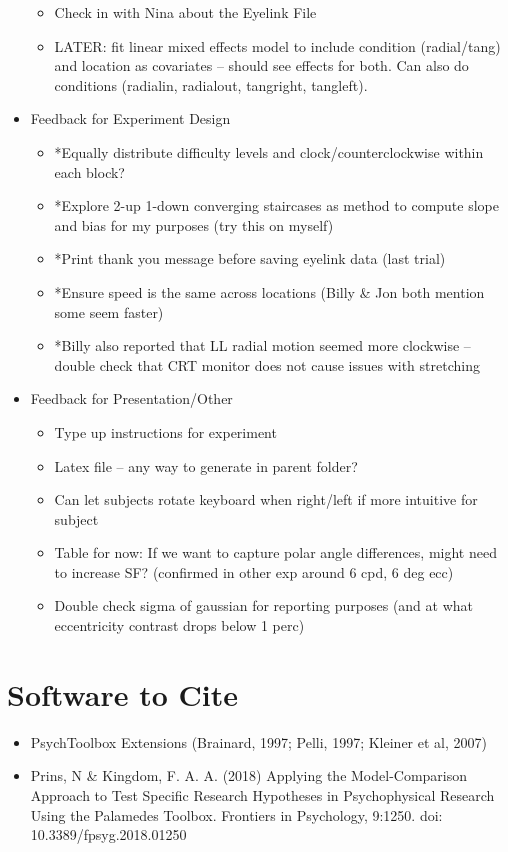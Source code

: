 \documentclass[11pt]{article} %
\begin{document}
\begin{itemize}
\begin{itemize}
	\item Check in with Nina about the Eyelink File
	\item LATER: fit linear mixed effects model to include condition (radial/tang) and location as covariates -- should see effects for both. Can also do conditions (radialin, radialout, tangright, tangleft).
	\end{itemize}
\item Feedback for Experiment Design
	\begin{itemize}
	\item *Equally distribute difficulty levels and clock/counterclockwise within each block?
	\item *Explore 2-up 1-down converging staircases as method to compute slope and bias for my purposes (try this on myself)
	\item *Print thank you message before saving eyelink data (last trial)
	\item *Ensure speed is the same across locations (Billy \& Jon both mention some seem faster)
	\item *Billy also reported that LL radial motion seemed more clockwise -- double check that CRT monitor does not cause issues with stretching
	\end{itemize}
\item Feedback for Presentation/Other
	\begin{itemize}
	\item Type up instructions for experiment
	\item Latex file -- any way to generate in parent folder?
	\item Can let subjects rotate keyboard when right/left if more intuitive for subject
	\item Table for now: If we want to capture polar angle differences, might need to increase SF? (confirmed in other exp around 6 cpd, 6 deg ecc)
	\item Double check sigma of gaussian for reporting purposes (and at what eccentricity contrast drops below 1 perc)
	\end{itemize}
\end{itemize}

\section{Software to Cite}
\begin{itemize}
\item PsychToolbox Extensions (Brainard, 1997; Pelli, 1997; Kleiner et al, 2007)
\item Prins, N \& Kingdom, F. A. A. (2018) Applying the Model-Comparison Approach to Test Specific Research Hypotheses in Psychophysical Research Using the Palamedes Toolbox. Frontiers in Psychology, 9:1250. doi: 10.3389/fpsyg.2018.01250
\end{itemize}
\end{document}
